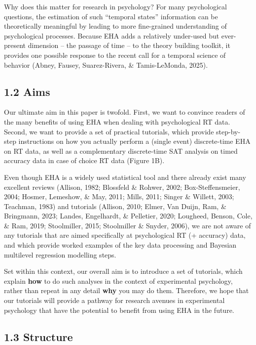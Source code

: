 \documentclass[
  man, donotrepeattitle,floatsintext]{apa6}
\begin{document}
Why does this matter for research in psychology? For many psychological questions, the estimation of such ``temporal states'' information can be theoretically meaningful by leading to more fine-grained understanding of psychological processes. Because EHA adds a relatively under-used but ever-present dimension -- the passage of time -- to the theory building toolkit, it provides one possible response to the recent call for a temporal science of behavior (Abney, Fausey, Suarez-Rivera, \& Tamis-LeMonda, 2025).

\subsection{1.2 Aims}\label{aims}

Our ultimate aim in this paper is twofold. First, we want to convince readers of the many benefits of using EHA when dealing with psychological RT data. Second, we want to provide a set of practical tutorials, which provide step-by-step instructions on how you actually perform a (single event) discrete-time EHA on RT data, as well as a complementary discrete-time SAT analysis on timed accuracy data in case of choice RT data (Figure 1B).

Even though EHA is a widely used statistical tool and there already exist many excellent reviews (Allison, 1982; Blossfeld \& Rohwer, 2002; Box-Steffensmeier, 2004; Hosmer, Lemeshow, \& May, 2011; Mills, 2011; Singer \& Willett, 2003; Teachman, 1983) and tutorials (Allison, 2010; Elmer, Van Duijn, Ram, \& Bringmann, 2023; Landes, Engelhardt, \& Pelletier, 2020; Lougheed, Benson, Cole, \& Ram, 2019; Stoolmiller, 2015; Stoolmiller \& Snyder, 2006), we are not aware of any tutorials that are aimed specifically at psychological RT (+ accuracy) data, and which provide worked examples of the key data processing and Bayesian multilevel regression modelling steps.

Set within this context, our overall aim is to introduce a set of tutorials, which explain \textbf{how} to do such analyses in the context of experimental psychology, rather than repeat in any detail \textbf{why} you may do them. Therefore, we hope that our tutorials will provide a pathway for research avenues in experimental psychology that have the potential to benefit from using EHA in the future.

\subsection{1.3 Structure}\label{structure}
\end{document}
